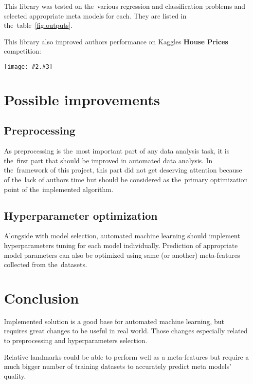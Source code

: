 \documentclass[hidelinks, english]{mvi-report}
\newcommand{\smplimage}[3][1]{
\centerline{
    \texttt{[image: \#2.\#3]}
}
}
\begin{document}
This library was tested on the~various regression and
classification problems and selected appropriate meta models for each. They are listed in the~table~\ref{fig:outputs}.

This library also improved authors performance on Kaggles \textbf{House Prices} competition:

\vspace{0.5cm}

\smplimage[0.5]{kaggle}{png}


\section{Possible improvements}

\subsection{Preprocessing}
As preprocessing is the~most important part of any data analysis task\cite{ten-quick-tips}, it is the~first part that
should be improved in automated data analysis. In the~framework of this project, this part did not get deserving attention
because of the~lack of authors time but should be considered as the~primary optimization point of the~implemented
algorithm.

\subsection{Hyperparameter optimization}
Alongside with model selection, automated machine learning should implement hyperparameters tuning for each model
individually. Prediction of appropriate model parameters can also be optimized using same (or another) meta-features
collected from the~datasets.

\section{Conclusion}

Implemented solution is a good base for automated machine learning, but requires great changes to be useful in real
world. Those changes especially related to preprocessing and hyperparameters selection.

Relative landmarks could be able to perform well as a meta-features but require a much bigger number of training
datasets to accurately predict meta models' quality.
\end{document}

